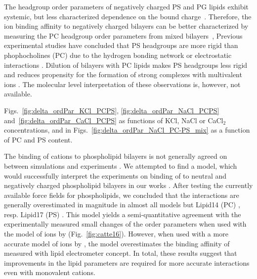 \documentclass[journal=jpcbfk,manuscript=article]{achemso}
\begin{document}

The headgroup order parameters
of negatively charged PS and PG lipids exhibit systemic, but less
characterized dependence on the bound charge~\cite{borle85,macdonald87,roux86,roux90}.
Therefore, the ion binding affinity to negatively charged bilayers
can be better characterized by measuring the PC headgroup order parameters from 
mixed bilayers~\cite{roux86,roux90,roux91},
%
Previous experimental studies have concluded that
PS headgroups are more rigid than phophocholines (PC)
due to the hydrogen bonding network or
electrostatic interactions \cite{browning80,buldt81}.
%
Dilution of bilayers with PC lipids makes PS headgroups
less rigid and reduces propensity for the formation of
strong complexes with multivalent ions \cite{browning80,buldt81,roux90,roux91}.
The molecular level interpretation of these observations is,
however, not available.


Figs.~\ref{fig:delta_ordPar_KCl_PCPS}, \ref{fig:delta_ordPar_NaCl_PCPS} 
and~\ref{fig:delta_ordPar_CaCl_PCPS} as functions of KCl, NaCl or CaCl$_2$ concentrations,
and in Figs.~\ref{fig:delta_ordPar_NaCl_PC-PS_mix} as a function of PC and PS content. 


The binding of  cations to phospholipid bilayers 
is not generally agreed on between simulations 
\citep{bockmann03,sachs04,berkowitz06,cordomi09}
and experiments 
\citep{cevc90,tocanne90,hauser76,herbette84,uhrikova08}.
We attempted to find a model, 
which would successfully interpret the experiments on binding of 
to neutral and negatively charged phospholipid bilayers \citep{akutsu81, roux90} 
in our works \citep{catte16, nmrlipids_proj4}.
After testing the currently available force fields for phospholipids,
we concluded
that the interactions are generally overestimated in magnitude in almost all models 
but Lipid14 (PC) \citep{dickson14}, resp. Lipid17 (PS) \citep{lipid17-future}. 
This model yields a semi-quantitative agreement with the experimentally measured small changes of the order parameters 
when used with the model of ions by \citet{aqvist90} (Fig.~\ref{fig:catte16}). 
However, when used with a more accurate model of ions by \citet{Pluharova2014, martinek17},
the model overestimates the binding affinity of 
measured with lipid electrometer concept. \citep{melcr18}
In total, these results suggest that improvements 
in the lipid parameters are required for more accurate interactions even with monovalent cations. 
\citep{catte16, melcr18, nmrlipids_proj4}
\end{document}

